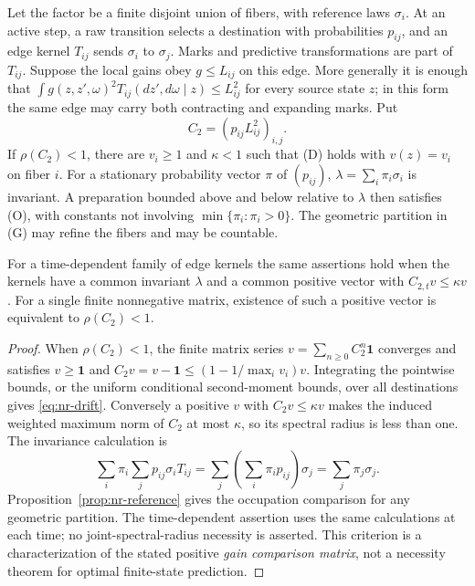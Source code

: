 \begin{proposition}\label{prop:nr-matrix}
Let the factor be a finite disjoint union of fibers, with reference laws $\sigma_i$. At an active step, a raw transition selects a destination with probabilities $p_{ij}$, and an edge kernel $T_{ij}$ sends $\sigma_i$ to $\sigma_j$. Marks and predictive transformations are part of $T_{ij}$. Suppose the local gains obey $g\le L_{ij}$ on this edge. More generally it is enough that $\int g(z,z',\omega)^2T_{ij}(dz',d\omega\mid z)\le L_{ij}^2$ for every source state $z$; in this form the same edge may carry both contracting and expanding marks. Put
\[
 C_2=(p_{ij}L_{ij}^2)_{i,j}.
\]
If $\rho(C_2)<1$, there are $v_i\ge1$ and $\kappa<1$ such that \textup{(D)} holds with $v(z)=v_i$ on fiber $i$. For a stationary probability vector $\pi$ of $(p_{ij})$, $\lambda=\sum_i\pi_i\sigma_i$ is invariant. A preparation bounded above and below relative to $\lambda$ then satisfies \textup{(O)}, with constants not involving $\min\{\pi_i:\pi_i>0\}$. The geometric partition in \textup{(G)} may refine the fibers and may be countable.

For a time-dependent family of edge kernels the same assertions hold when the kernels have a common invariant $\lambda$ and a common positive vector with $C_{2,t}v\le\kappa v$. For a single finite nonnegative matrix, existence of such a positive vector is equivalent to $\rho(C_2)<1$.
\end{proposition}
\begin{proof}
When $\rho(C_2)<1$, the finite matrix series $v=\sum_{n\ge0}C_2^n\mathbf1$ converges and satisfies $v\ge\mathbf1$ and $C_2v=v-\mathbf1\le(1-1/\max_i v_i)v$. Integrating the pointwise bounds, or the uniform conditional second-moment bounds, over all destinations gives \eqref{eq:nr-drift}. Conversely a positive $v$ with $C_2v\le\kappa v$ makes the induced weighted maximum norm of $C_2$ at most $\kappa$, so its spectral radius is less than one. The invariance calculation is
\[
 \sum_i\pi_i\sum_jp_{ij}\sigma_iT_{ij}
        =\sum_j\left(\sum_i\pi_ip_{ij}\right)\sigma_j
        =\sum_j\pi_j\sigma_j.
\]
Proposition~\ref{prop:nr-reference} gives the occupation comparison for any geometric partition. The time-dependent assertion uses the same calculations at each time; no joint-spectral-radius necessity is asserted. This criterion is a characterization of the stated positive \emph{gain comparison matrix}, not a necessity theorem for optimal finite-state prediction.
\end{proof}

